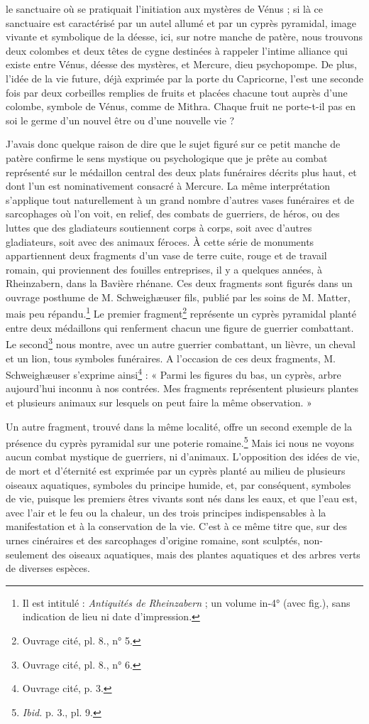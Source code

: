 \documentclass{article}
\begin{document}
le sanctuaire où se pratiquait l'initiation aux mystères de Vénus ; si là ce sanctuaire est caractérisé par un autel allumé et par un cyprès pyramidal, image vivante et symbolique de la déesse, ici, sur notre manche de patère, nous trouvons deux colombes et deux têtes de cygne destinées à rappeler l'intime alliance qui existe entre Vénus, déesse des mystères, et Mercure, dieu psychopompe. De plus, l'idée de la vie future, déjà exprimée par la porte du Capricorne, l'est une seconde fois par deux corbeilles remplies de fruits et placées chacune tout auprès d'une colombe, symbole de Vénus, comme de Mithra. Chaque fruit ne porte-t-il pas en soi le germe d'un nouvel être ou d'une nouvelle vie ?

J'avais donc quelque raison de dire que le sujet figuré sur ce petit manche de patère confirme le sens mystique ou psychologique que je prête au combat représenté sur le médaillon central des deux plats funéraires décrits plus haut, et dont l'un est nominativement consacré à Mercure. La même interprétation s'applique tout naturellement à un grand nombre d'autres vases funéraires et de sarcophages où l'on voit, en relief, des combats de guerriers, de héros, ou des luttes que des gladiateurs soutiennent corps à corps, soit avec d'autres gladiateurs, soit avec des animaux féroces. À cette série de monuments appartiennent deux fragments d'un vase de terre cuite, rouge et de travail romain, qui proviennent des fouilles entreprises, il y a quelques années, à Rheinzabern, dans la Bavière rhénane. Ces deux fragments sont figurés dans un ouvrage posthume de M. Schweighæuser fils, publié par les soins de M. Matter, mais peu répandu.\footnote{Il est intitulé : \emph{Antiquités de Rheinzabern} ; un volume in-4° (avec fig.), sans indication de lieu ni date d'impression.} Le premier fragment\footnote{Ouvrage cité, pl. 8., n° 5.} représente un cyprès pyramidal planté entre deux médaillons qui renferment chacun une figure de guerrier combattant. Le second\footnote{Ouvrage cité, pl. 8., n° 6.} nous montre, avec un autre guerrier combattant, un lièvre, un cheval et un lion, tous symboles funéraires. A l'occasion de ces deux fragments, M. Schweighæuser s'exprime ainsi\footnote{Ouvrage cité, p. 3.} : « Parmi les figures du bas, un cyprès, arbre aujourd'hui inconnu à nos contrées. Mes fragments représentent plusieurs plantes et plusieurs animaux sur lesquels on peut faire la même observation. »

Un autre fragment, trouvé dans la même localité, offre un second exemple de la présence du cyprès pyramidal sur une poterie romaine.\footnote{\emph{Ibid.} p. 3., pl. 9.} Mais ici nous ne voyons aucun combat mystique de guerriers, ni d'animaux. L'opposition des idées de vie, de mort et d'éternité est exprimée par un cyprès planté au milieu de plusieurs oiseaux aquatiques, symboles du principe humide, et, par conséquent, symboles de vie, puisque les premiers êtres vivants sont nés dans les eaux, et que l'eau est, avec l'air et le feu ou la chaleur, un des trois principes indispensables à la manifestation et à la conservation de la vie. C'est à ce même titre que, sur des urnes cinéraires et des sarcophages d'origine romaine, sont sculptés, non-seulement des oiseaux aquatiques, mais des plantes aquatiques et des arbres verts de diverses espèces.
\end{document}
